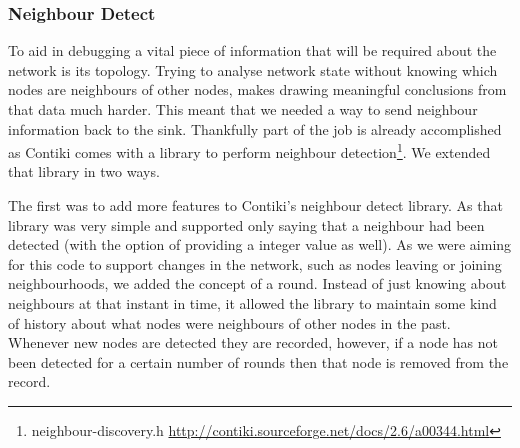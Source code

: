 \begin{figure}[H]
\centering
{}
\end{figure}

\subsubsection{Neighbour Detect}

To aid in debugging a vital piece of information that will be required about the network is its topology. Trying to analyse network state without knowing which nodes are neighbours of other nodes, makes drawing meaningful conclusions from that data much harder. This meant that we needed a way to send neighbour information back to the sink. Thankfully part of the job is already accomplished as Contiki comes with a library to perform neighbour detection\footnote{neighbour-discovery.h \url{http://contiki.sourceforge.net/docs/2.6/a00344.html}}. We extended that library in two ways.

The first was to add more features to Contiki's neighbour detect library. As that library was very simple and supported only saying that a neighbour had been detected (with the option of providing a integer value as well). As we were aiming for this code to support changes in the network, such as nodes leaving or joining neighbourhoods, we added the concept of a round. Instead of just knowing about neighbours at that instant in time, it allowed the library to maintain some kind of history about what nodes were neighbours of other nodes in the past. Whenever new nodes are detected they are recorded, however, if a node has not been detected for a certain number of rounds then that node is removed from the record.


